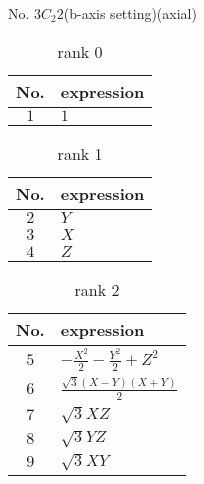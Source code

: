 \documentclass[fleqn,8pt,landscape]{jsarticle}
\begin{document}
\setcounter{MaxMatrixCols}{16}

\begin{center}
\LARGE
No. 3\quad$C_{2}$\quad$2$\quad(b-axis setting)\quad[ monoclinic ] (axial)
\end{center}
\begin{table}[ht!]
\begin{center}
\caption{rank 0}
\renewcommand{\arraystretch}{1.3}
\begin{tabular}{cl} \hline \hline
No. & expression \\ \hline
$ 1 $ & $ 1 $ \\
 \hline \hline
\end{tabular}
\end{center}
\end{table}
\begin{table}[ht!]
\begin{center}
\caption{rank 1}
\renewcommand{\arraystretch}{1.3}
\begin{tabular}{cl} \hline \hline
No. & expression \\ \hline
$ 2 $ & $ Y $ \\
$ 3 $ & $ X $ \\
$ 4 $ & $ Z $ \\
 \hline \hline
\end{tabular}
\end{center}
\end{table}
\begin{table}[ht!]
\begin{center}
\caption{rank 2}
\renewcommand{\arraystretch}{1.3}
\begin{tabular}{cl} \hline \hline
No. & expression \\ \hline
$ 5 $ & $ - \frac{X^{2}}{2} - \frac{Y^{2}}{2} + Z^{2} $ \\
$ 6 $ & $ \frac{\sqrt{3} \left(X - Y\right) \left(X + Y\right)}{2} $ \\
$ 7 $ & $ \sqrt{3} X Z $ \\
$ 8 $ & $ \sqrt{3} Y Z $ \\
$ 9 $ & $ \sqrt{3} X Y $ \\
 \hline \hline
\end{tabular}
\end{center}
\end{table}
\end{document}
